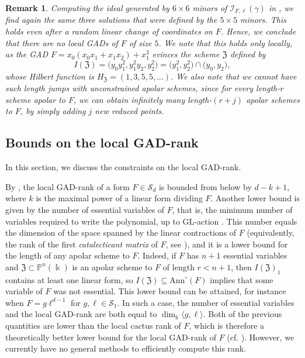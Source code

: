 \documentclass{amsart}
\theoremstyle{plain}
\newtheorem{remark}[remark]{Remark}
\renewcommand{\k}{\Bbbk}
\renewcommand{\S}{\mathcal{S}}
\newcommand{\Ann}{\textnormal{Ann}}
\newcommand{\ideal}[1]{\mathopen{}\bigl( #1 \bigr)\mathclose{}}
\def\Z{\mathfrak{Z}}
\def\GL{\mathrm{GL}}
\def\Ann{\mathrm{Ann}}
\numberwithin{equation}{section}
\begin{document}
\begin{remark} \label{rmk:norank5}
    Computing the ideal generated by $6\times 6$ minors of $\mathcal{I}_{F,\ell}(\gamma)$ in , we find again the same three solutions that were defined by the $5\times 5$ minors.
    This holds even after a random linear change of coordinates on $F$. 
    Hence, we conclude that there are no local GADs of $F$ of size $5$.
    We note that this holds only locally, as the GAD $F = x_0(x_0x_1+x_1x_2) + x_1^3$ evinces the scheme $\Z$ defined by
    \[ I(\Z) = \ideal{ y_0y_1^2, y_1^2y_2, y_2^2 } = \ideal{y_1^2,y_2^2} \cap \ideal{y_0,y_2}, \]
    whose Hilbert function is $H_{\Z} = (1,3,5,5,\dots)$.
    We also note that we cannot have such \emph{length jumps} with unconstrained apolar schemes, since for every length-$r$ scheme apolar to $F$, we can obtain infinitely many length-$(r+j)$ apolar schemes to $F$, by simply adding $j$ new reduced points.
\end{remark}

 



\subsection{Bounds on the local GAD-rank} \label{sec:boundslocalGADrank}
In this section, we discuss the constraints on the local GAD-rank.

By , the local GAD-rank of a form $F \in \S_d$ is bounded from below by $d-k+1$, where $k$ is the maximal power of a linear form dividing $F$.
Another lower bound is given by the number of essential variables of $F$, that is, the minimum number of variables required to write the polynomial, up to $\GL$-action \cite{C05}.
This number equals the dimension of the space spanned by the linear contractions of $F$ (equivalently, the rank of the first \emph{catalecticant matrix} of $F$, see ), and it is a lower bound for the length of any apolar scheme to $F$.
Indeed, if $F$ has $n+1$ essential variables and $\Z \subset \mathbb P^n(\k)$ is an apolar scheme to $F$ of length $r<n+1$, then $I(\Z)_1$ contains at least one linear form, so $I(\Z) \subseteq \Ann^{\circ}(F)$ implies that some variable of $F$ was not essential.
This lower bound can be attained, for instance when $F = g \ell^{d-1}$ for $g,\ell \in \S_1$.
In such a case, the number of essential variables and the local GAD-rank are both equal to $\dim_{\k}\langle g,\ell\rangle$.
Both of the previous quantities are lower than the local cactus rank of $F$, which is therefore a theoretically better lower bound for the local GAD-rank of $F$ (cf. ).
However, we currently have no general methods to efficiently compute this rank.
\end{document}
